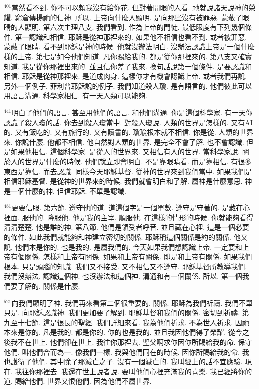 \documentclass{book}
\begin{document}
$^{401}$當然看不到.
你不可以賴我沒有給你花.
但對著開眼的人看.
祂就說諸天說神的榮耀.
窮倉傳揚祂的信神.
所以.
上帝向什麼人顯明.
是向那些沒有被罪惡.
蒙蔽了眼睛的人顯明.
第六次主理八支.
我們看到.
作為上帝的門徒.
最低限度有下列幾個條件.
第一認識和相信.
耶穌是從神那裡來的.
如果他不相信也看不到.
或者被罪惡.
蒙蔽了眼睛.
看不到耶穌是神的時候.
他就沒辦法明白.
沒辦法認識上帝是一個什麼樣的上帝.
第七是如今他們知道.
凡你賜給我的.
都是從你那裡來的.
第八支又確實知道.
我是從你那裡出來的.
並且信你差了我來.
換句話說第一個條件.
是要認識和相信.
耶穌是從神那裡來.
是道成肉身.
這樣你才有機會認識上帝.
或者我們再說.
另外一個例子.
菲利普耶穌說的例子.
我們知道殺人瓊.
是有語言的.
他們彼此可以用語言溝通.
科學家相信.
有一天人類可以能夠.

$^{441}$明白了他們的語言.
甚至用他們的語言.
和他們溝通.
你是這個科學家.
有一天你認識了殺人瓊的話.
你去到殺人瓊當中.
對殺人瓊說.
人類的世界是怎樣的.
又有AI的.
又有飯吃的.
又有旅行的.
又有讀書的.
瓊瑜根本就不相信.
你是從.
人類的世界來.
你說什麼.
他都不相信.
他自然對人類的世界.
是完全不會了解.
也不會認識.
但是如果他相信.
這個科學家.
是從人的世界來.
又相信有人的世界.
當科學家說.
關於人的世界是什麼的時候.
他們就立即會明白.
不是靠眼睛看.
而是靠相信.
有很多東西是靠信.
而去認識.
同樣今天耶穌基督.
從神的世界來到我們當中.
如果我們是相信耶穌基督.
是從神的世界來的時候.
我們就會明白和了解.
屬神是什麼意思.
神是一個什麼的神.
但信耶穌.
不單是認識.

$^{481}$更要信服.
第六節.
遵守他的道.
道這個字是一個單數.
遵守是守著的.
是藏在心裡面.
服他的.
降服他.
他是我的主宰.
順服他.
在這樣的情形的時候.
你就能夠看得清清楚楚.
他是誰的神.
第八節.
他們是領受者呼音.
並且藏在心裡.
這是一個必要的條件.
如此我們就能夠和神建立密切的關係.
耶穌稱這個關係是約的關係.
他又說.
他們本是你的.
也是我的.
是屬我們的.
今天如果我們想認識上帝.
一定要和上帝有個關係.
怎樣和上帝有關係.
如果和上帝有關係.
即是和上帝有關係.
如果我們根本.
只是頭腦的知識.
我們又不接受.
又不相信又不遵守.
耶穌基督所教導我們.
我們沒辦法.
認識這個神.
也沒辦法和這個神.
溝通和有一個關係.
所以.
第一個我們要了解的.
關係是什麼.

$^{521}$向我們顯明了神.
我們再來看第二個很重要的.
關係.
耶穌為我們祈禱.
我們不單只是.
向耶穌認識神.
我們更加要了解到.
耶穌基督和我們的關係.
密切到祈禱.
第九至十七節.
這是很長的聖經.
我們詳細來看.
我為他們祈求.
不為世人祈求.
因祂本來是你的.
凡是我的.
都是你的.
你的也是我的.
並且我因他們得了榮耀.
從今之後我不在世上.
他們卻在世上.
我往你那裡去.
聖父啊求你因你所賜給我的命.
保守他們.
叫他們合而為一.
像我們一樣.
我與他們同在的時候.
因你所賜給我的命.
我也護衛了他們.
其中除了那滅亡之子.
沒有一個滅亡的.
我叫經上的話不宜應驗.
現在.
我往你那裡去.
我還在世上說者說.
要叫他們心裡充滿我的喜樂.
我已經將你的道.
賜給他們.
世界又恨他們.
因為他們不屬世界.
\end{document}
